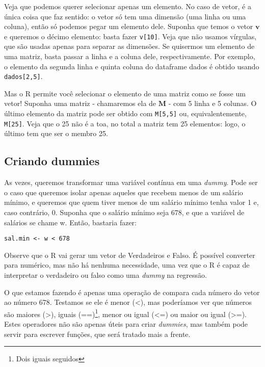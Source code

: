 \documentclass[]{book}
\let\rmarkdownfootnote\footnote%
\def\footnote{\protect\rmarkdownfootnote}
\begin{document}
Veja que podemos querer selecionar apenas um elemento. No caso de vetor,
é a única coisa que faz sentido: o vetor só tem uma dimensão (uma linha
ou uma coluna), então só podemos pegar um elemento dele. Suponha que
temos o vetor \(\mathbf{v}\) e queremos o décimo elemento: basta fazer
\texttt{v{[}10{]}}. Veja que não usamos vírgulas, que são usadas apenas
para separar as dimensões. Se quisermos um elemento de uma matriz, basta
passar a linha e a coluna dele, respectivamente. Por exemplo, o elemento
da segunda linha e quinta coluna do dataframe dados é obtido usando
\texttt{dados{[}2,5{]}}.

Mas o R permite você selecionar o elemento de uma matriz como se fosse
um vetor! Suponha uma matriz - chamaremos ela de \(\mathbf{M}\) - com 5
linha e 5 colunas. O último elemento da matriz pode ser obtido com
\texttt{M{[}5,5{]}} ou, equivalentemente, \texttt{M{[}25{]}}. Veja que o
25 não é a toa, no total a matriz tem 25 elementos: logo, o último tem
que ser o membro 25.

\subsection{Criando dummies}

As vezes, queremos transformar uma variável contínua em uma
\emph{dummy}. Pode ser o caso que queremos isolar apenas aqueles que
recebem menos de um salário mínimo, e queremos que quem tiver menos de
um salário mínimo tenha valor 1 e, caso contrário, 0. Suponha que o
salário mínimo seja 678, e que a variável de salários se chame w. Então,
bastaria fazer:

\begin{verbatim}
sal.min <- w < 678
\end{verbatim}

Observe que o R vai gerar um vetor de Verdadeiros e Falso. É possível
converter para numérico, mas não há nenhuma necessidade, uma vez que o R
é capaz de interpretar o verdadeiro ou falso como uma \emph{dummy} na
regressão.

O que estamos fazendo é apenas uma operação de compara cada número do
vetor ao número 678. Testamos se ele é menor (\textless{}), mas
poderíamos ver que números são maiores (\textgreater{}), iguais
(==)\footnote{Dois iguais seguidos}, menor ou igual (\textless{}=) ou
maior ou igual (\textgreater{}=). Estes operadores não são apenas úteis
para criar \emph{dummies}, mas também pode servir para escrever funções,
que será tratado mais a frente.
\end{document}
